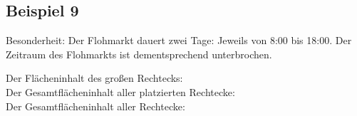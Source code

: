 \subsection{Beispiel 9}\label{ex:9}
Besonderheit: Der Flohmarkt dauert zwei Tage: Jeweils von 8:00 bis 18:00.
Der Zeitraum des Flohmarkts ist dementsprechend unterbrochen.
\vspace{.4cm}

\noindent Der Flächeninhalt des großen Rechtecks: \\
Der Gesamtflächeninhalt aller platzierten Rechtecke: \\
Der Gesamtflächeninhalt aller Rechtecke: 